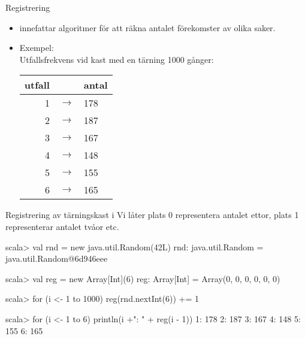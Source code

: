 

\ifkompendium\else


\begin{Slide}{Registrering}
\begin{itemize}
\item {} innefattar algoritmer för att räkna antalet förekomster av olika saker.

\item Exempel: 
\\\vspace{0.5em}Utfallsfrekvens vid kast med en tärning 1000 gånger:

\vspace{1em}\begin{tabular}{r c l}
utfall & & antal \\ \hline
1 & $\rightarrow$ & 178 \\
2 & $\rightarrow$ & 187 \\
3 & $\rightarrow$ & 167 \\
4 & $\rightarrow$ & 148 \\
5 & $\rightarrow$ & 155 \\
6 & $\rightarrow$ & 165 \\
\end{tabular}
\end{itemize}
\end{Slide}

\begin{Slide}{Registrering av tärningskast i }
Vi låter plats 0 representera antalet ettor, plats 1 representerar antalet tvåor etc.
\begin{REPLnonum}
scala> val rnd = new java.util.Random(42L)
rnd: java.util.Random = java.util.Random@6d946eee

scala> val reg = new Array[Int](6)
reg: Array[Int] = Array(0, 0, 0, 0, 0, 0)

scala> for (i <- 1 to 1000) reg(rnd.nextInt(6)) += 1

scala> for (i <- 1 to 6) println(i +": " + reg(i - 1))
1: 178
2: 187
3: 167
4: 148
5: 155
6: 165
\end{REPLnonum}
\end{Slide}


